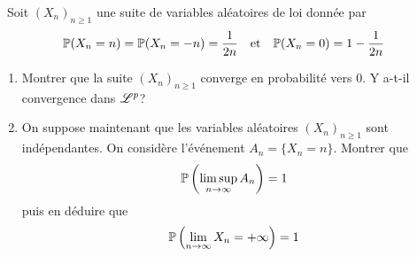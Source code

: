 \begin{td-exo}[]\, %
    Soit \({(X_n)}_{n\geq 1}\) une suite de variables aléatoires
    de loi donnée par
    \begin{equation*}
        \mathbb{P}(X_n=n)=\mathbb{P}(X_n=-n)=\frac{1}{2n}\quad\text{et}\quad \mathbb{P}(X_n=0)=1-\frac{1}{2n}
    \end{equation*}
    \begin{enumerate}
        \item Montrer que la suite \({(X_n)}_{n\geq 1}\) 
        converge en probabilité vers 0. Y a-t-il convergence
        dans \(\mathscr{L}^p\)?

        \item On suppose maintenant que les variables aléatoires
        \({(X_n)}_{n\geq 1}\) sont indépendantes. On considère
        l'événement \(A_n=\{X_n=n\}\). Montrer que
        \begin{equation*}
            \mathbb{P}\left(\limsup_{n\to\infty} A_n\right) = 1
        \end{equation*}
        puis en déduire que
        \begin{equation*}
            \mathbb{P}\left(\lim_{n\to\infty} X_n = +\infty\right) = 1
        \end{equation*}
    \end{enumerate}
\end{td-exo}

